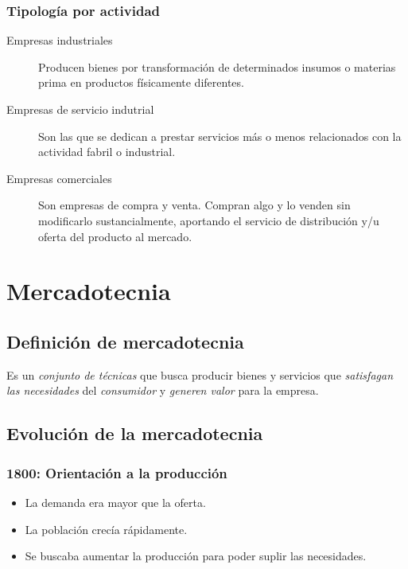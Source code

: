 \documentclass[spanish, twocolumn, twoside,openany]{book}
\begin{document}
\subsection{Tipología por actividad}
\begin{description}
	\item[Empresas industriales] Producen bienes por transformación de determinados insumos o materias prima en productos físicamente diferentes.
	
	\item[Empresas de servicio indutrial] Son las que se dedican a prestar servicios más o menos relacionados con la actividad fabril o industrial.
	
	\item[Empresas comerciales] Son empresas de compra y venta. Compran algo y lo venden sin modificarlo sustancialmente, aportando el servicio de distribución y/u oferta del producto al mercado.
\end{description}



\chapter{Mercadotecnia}

\section{Definición de mercadotecnia}
Es un \emph{conjunto de técnicas} que busca producir bienes y servicios que \emph{satisfagan las necesidades} del \emph{consumidor} y \emph{generen valor} para la empresa.

\section{Evolución de la mercadotecnia}

\subsection{1800: Orientación a la producción}

\begin{itemize}
	\item La demanda era mayor que la oferta.
	\item La población crecía rápidamente.
	\item Se buscaba aumentar la producción para poder suplir las necesidades.
\end{itemize}
\end{document}
